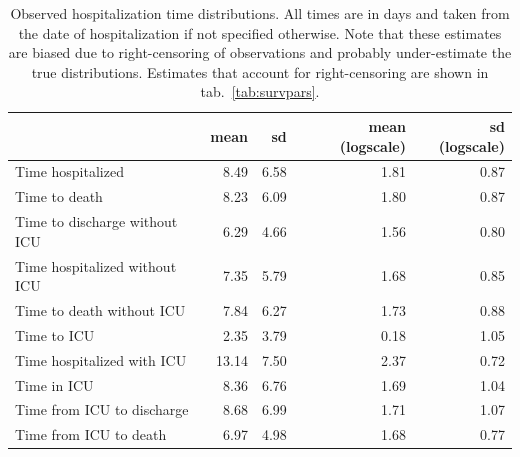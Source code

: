 \begin{table}[t]
\caption[Observed hospitalization time distributions]{Observed hospitalization time distributions. All times are in days and taken from the date of hospitalization if not specified otherwise. Note that these estimates are biased due to right-censoring of observations and probably under-estimate the true distributions. Estimates that account for right-censoring are shown in tab.~\ref{tab:survpars}.}
\label{tab:vdparams}
\centering
\begin{tabular}{lrrrr}
\toprule
 & mean & sd & mean (logscale) & sd (logscale)\\
\midrule
Time hospitalized & 8.49 & 6.58 & 1.81 & 0.87\\
Time to death & 8.23 & 6.09 & 1.80 & 0.87\\ \addlinespace
Time to discharge without ICU & 6.29 & 4.66 & 1.56 & 0.80\\
Time hospitalized without ICU & 7.35 & 5.79 & 1.68 & 0.85\\
Time to death without ICU & 7.84 & 6.27 & 1.73 & 0.88\\ \addlinespace
Time to ICU & 2.35 & 3.79 & 0.18 & 1.05\\
Time hospitalized with ICU & 13.14 & 7.50 & 2.37 & 0.72\\
Time in ICU & 8.36 & 6.76 & 1.69 & 1.04\\
Time from ICU to discharge & 8.68 & 6.99 & 1.71 & 1.07\\
Time from ICU to death & 6.97 & 4.98 & 1.68 & 0.77\\
\bottomrule
\end{tabular}
\end{table}


